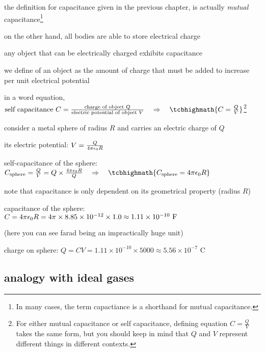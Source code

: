 the definition for capacitance given in the previous chapter, is actually \emph{mutual} capacitance\footnote{In many cases, the term capactiance is a shorthand for mutual capacitance.}

on the other hand, all bodies are able to store electrical charge

any object that can be electrically charged exhibits capacitance

we define  of an object as the amount of charge that must be added to increase per unit electrical potential

in a word equation, $ \text{self capacitance }C=\frac{\text{charge of object }Q}{\text{electric potential of object }V} \RA \tcbhighmath{C=\frac{Q}{V}}$\footnote{For either mutual capacitance or self capacitance, defining equation $C=\frac{Q}{V}$ takes the same form, but you should keep in mind that $Q$ and $V$ represent different things in different contexts.}


consider a metal sphere of radius $R$ and carries an electric charge of $Q$

its electric potential: $V = \frac{Q}{4\pi\epsilon_0 R}$

\begin{soln}
self-capacitance of the sphere: $C_\text{sphere} = \frac{Q}{V} = Q \times \frac{\ec R}{Q} \RA \tcbhighmath{C_\text{sphere} = \ec R}$

note that capacitance is only dependent on its geometrical property (radius $R$) \end{soln}


\begin{soln} capacitance of the sphere: $C = 4\pi\epsilon_0 R = 4\pi\times8.85\times10^{-12}\times 1.0 \approx 1.11\times10^{-10} \text{ F}$

(here you can see farad being an impractically huge unit)

charge on sphere: $Q = CV = 1.11\times10^{-10} \times 5000 \approx 5.56\times 10^{-7} \text{ C}$ \end{soln}

\subsection*{analogy with ideal gases}

